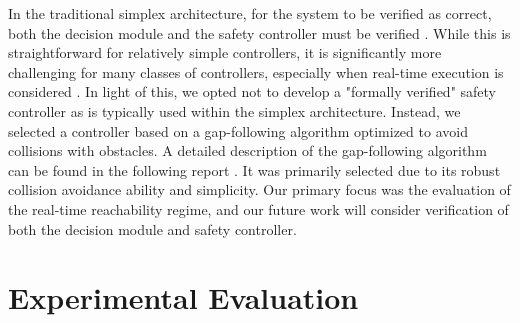 \documentclass[manuscript,screen,review]{acmart}
\newcommand{\todo}[1]{\textcolor{red}{\textbf{\underline{TODO:}} #1}}
\begin{document}

In the traditional simplex architecture, for the system to be verified as correct, both the decision module and the safety controller must be verified \cite{Mehmood2021}. While this is straightforward for relatively simple controllers, it is significantly more challenging for many classes of controllers, especially when real-time execution is considered \cite{ivanov2020case}. In light of this, we opted not to develop a "formally verified" safety controller as is typically used within the simplex architecture. Instead, we selected a controller based on a gap-following algorithm optimized to avoid collisions with obstacles. A detailed description of the gap-following algorithm can be found in the following report \cite{otterness_2019}. It was primarily selected due to its robust collision avoidance ability and simplicity. Our primary focus was the evaluation of the real-time reachability regime, and our future work will consider verification of both the decision module and safety controller. 


\section{Experimental Evaluation}
\label{sec:experiments}

\end{document}
